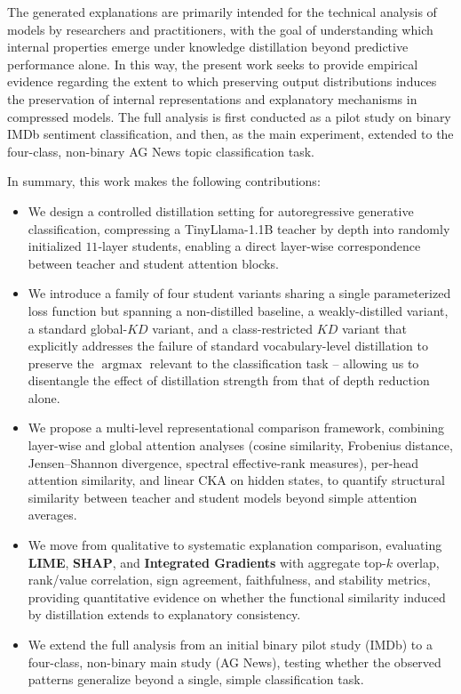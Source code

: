 \documentclass[conference]{IEEEtran}
\newcommand{\argmax}{\operatorname*{argmax}}
\begin{document}
The generated explanations are primarily intended for the technical analysis of models by researchers and practitioners, with the goal of understanding which internal properties emerge under knowledge distillation beyond predictive performance alone. In this way, the present work seeks to provide empirical evidence regarding the extent to which preserving output distributions induces the preservation of internal representations and explanatory mechanisms in compressed models. The full analysis is first conducted as a pilot study on binary IMDb sentiment classification, and then, as the main experiment, extended to the four-class, non-binary AG News topic classification task.

In summary, this work makes the following contributions:
\begin{itemize}
    \item We design a controlled distillation setting for autoregressive generative classification, compressing a TinyLlama-1.1B teacher by depth into randomly initialized $11$-layer students, enabling a direct layer-wise correspondence between teacher and student attention blocks.
    \item We introduce a family of four student variants sharing a single parameterized loss function but spanning a non-distilled baseline, a weakly-distilled variant, a standard global-$KD$ variant, and a class-restricted $KD$ variant that explicitly addresses the failure of standard vocabulary-level distillation to preserve the $\argmax$ relevant to the classification task -- allowing us to disentangle the effect of distillation strength from that of depth reduction alone.
    \item We propose a multi-level representational comparison framework, combining layer-wise and global attention analyses (cosine similarity, Frobenius distance, Jensen--Shannon divergence, spectral effective-rank measures), per-head attention similarity, and linear CKA on hidden states, to quantify structural similarity between teacher and student models beyond simple attention averages.
    \item We move from qualitative to systematic explanation comparison, evaluating \textbf{LIME}, \textbf{SHAP}, and \textbf{Integrated Gradients} with aggregate top-$k$ overlap, rank/value correlation, sign agreement, faithfulness, and stability metrics, providing quantitative evidence on whether the functional similarity induced by distillation extends to explanatory consistency.
    \item We extend the full analysis from an initial binary pilot study (IMDb) to a four-class, non-binary main study (AG News), testing whether the observed patterns generalize beyond a single, simple classification task.
\end{itemize}
\end{document}
